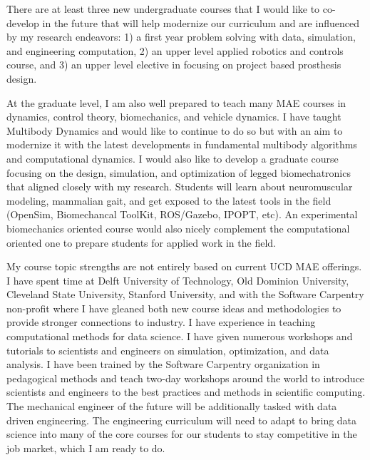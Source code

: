 \documentclass{article}
\begin{document}
There are at least three new undergraduate courses that I would like to
co-develop in the future that will help modernize our curriculum and are
influenced by my research endeavors: 1) a first year problem solving with data,
simulation, and engineering computation, 2) an upper level applied robotics and
controls course, and 3) an upper level elective in focusing on project based
prosthesis design.

At the graduate level, I am also well prepared to teach many MAE courses in
dynamics, control theory, biomechanics, and vehicle dynamics. I have taught
Multibody Dynamics and would like to continue to do so but with an aim to
modernize it with the latest developments in fundamental multibody algorithms
and computational dynamics. I would also like to develop a graduate course
focusing on the design, simulation, and optimization of legged biomechatronics
that aligned closely with my research. Students will learn about neuromuscular
modeling, mammalian gait, and get exposed to the latest tools in the field
(OpenSim, Biomechancal ToolKit, ROS/Gazebo, IPOPT, etc). An experimental
biomechanics oriented course would also nicely complement the computational
oriented one to prepare students for applied work in the field.

My course topic strengths are not entirely based on current UCD MAE offerings.
I have spent time at Delft University of Technology, Old Dominion University,
Cleveland State University, Stanford University, and with the Software
Carpentry non-profit where I have gleaned both new course ideas and
methodologies to provide stronger connections to industry. I have experience in
teaching computational methods for data science. I have given numerous
workshops and tutorials to scientists and engineers on simulation,
optimization, and data analysis. I have been trained by the Software Carpentry
organization in pedagogical methods and teach two-day workshops around the
world to introduce scientists and engineers to the best practices and methods
in scientific computing. The mechanical engineer of the future will be
additionally tasked with data driven engineering. The engineering curriculum
will need to adapt to bring data science into many of the core courses for our
students to stay competitive in the job market, which I am ready to do.
\end{document}
